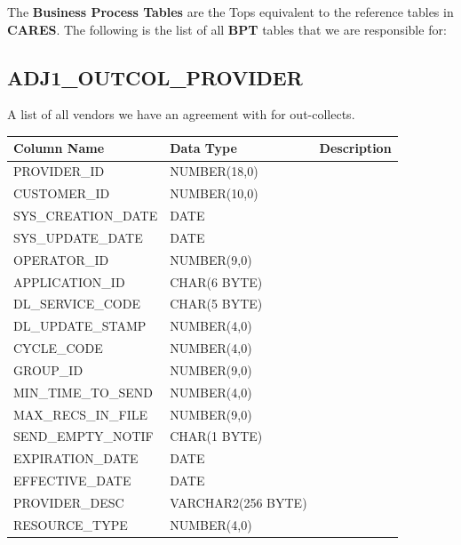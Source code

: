 \documentclass[12pt,twoside]{article}
\begin{document}
  The \textbf{Business Process Tables} are the Tops equivalent to the
  reference tables in \textbf{CARES}. The following is the list of all \textbf{BPT}
  tables that we are responsible for:
\subsection{ADJ1\_OUTCOL\_PROVIDER}
\label{sec-9-1}

   A list of all vendors we have an agreement with for out-collects.
\scriptsize

\begin{center}
\begin{tabular}{lll}
\hline
 \textbf{Column Name}  &  \textbf{Data Type}  &  \textbf{Description}  \\
\hline
 PROVIDER\_ID          &  NUMBER(18,0)        &                        \\
 CUSTOMER\_ID          &  NUMBER(10,0)        &                        \\
 SYS\_CREATION\_DATE   &  DATE                &                        \\
 SYS\_UPDATE\_DATE     &  DATE                &                        \\
 OPERATOR\_ID          &  NUMBER(9,0)         &                        \\
 APPLICATION\_ID       &  CHAR(6 BYTE)        &                        \\
 DL\_SERVICE\_CODE     &  CHAR(5 BYTE)        &                        \\
 DL\_UPDATE\_STAMP     &  NUMBER(4,0)         &                        \\
 CYCLE\_CODE           &  NUMBER(4,0)         &                        \\
 GROUP\_ID             &  NUMBER(9,0)         &                        \\
 MIN\_TIME\_TO\_SEND   &  NUMBER(4,0)         &                        \\
 MAX\_RECS\_IN\_FILE   &  NUMBER(9,0)         &                        \\
 SEND\_EMPTY\_NOTIF    &  CHAR(1 BYTE)        &                        \\
 EXPIRATION\_DATE      &  DATE                &                        \\
 EFFECTIVE\_DATE       &  DATE                &                        \\
 PROVIDER\_DESC        &  VARCHAR2(256 BYTE)  &                        \\
 RESOURCE\_TYPE        &  NUMBER(4,0)         &                        \\
\hline
\end{tabular}
\end{center}
\end{document}
